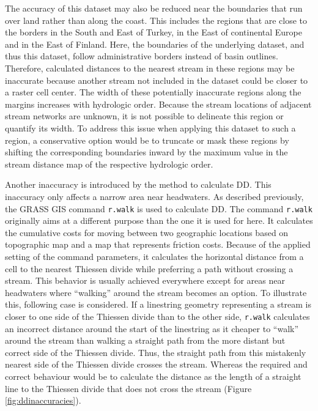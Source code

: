 \documentclass[fleqn,10pt]{wlscirep}
\begin{document}
The accuracy of this dataset may also be reduced near the boundaries that run over land rather than along the coast. This includes the regions that are close to the borders in the South and East of Turkey, in the East of continental Europe and in the East of Finland. Here, the boundaries of the underlying dataset, and thus this dataset, follow administrative borders instead of basin outlines. Therefore, calculated distances to the nearest stream in these regions may be inaccurate because another stream not included in the dataset could be closer to a raster cell center. The width of these potentially inaccurate regions along the margins increases with hydrologic order. Because the stream locations of adjacent stream networks are unknown, it is not possible to delineate this region or quantify its width. To address this issue when applying this dataset to such a region, a conservative option would be to truncate or mask these regions by shifting the corresponding boundaries inward by the maximum value in the stream distance map of the respective hydrologic order.

Another inaccuracy is introduced by the method to calculate DD. This inaccuracy only affects a narrow area near headwaters. As described previously, the GRASS GIS command \texttt{r.walk} is used to calculate DD. The command \texttt{r.walk} originally aims at a different purpose than the one it is used for here. It calculates the cumulative costs for moving between two geographic locations based on topographic map and a map that represents friction costs. Because of the applied setting of the command parameters, it calculates the horizontal distance from a cell to the nearest Thiessen divide while preferring a path without crossing a stream. This behavior is usually achieved everywhere except for areas near headwaters where ``walking'' around the stream becomes an option. To illustrate this, following case is considered. If a linestring geometry representing a stream is closer to one side of the Thiessen divide than to the other side, \texttt{r.walk} calculates an incorrect distance around the start of the linestring as it cheaper to ``walk'' around the stream than walking a straight path from the more distant but correct side of the Thiessen divide. Thus, the straight path from this mistakenly nearest side of the Thiessen divide crosses the stream. Whereas the required and correct behaviour would be to calculate the distance as the length of a straight line to the Thiessen divide that does not cross the stream (Figure \ref{fig:ddinaccuracies}).
\end{document}
